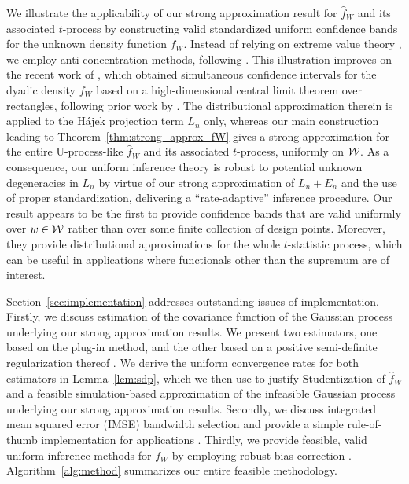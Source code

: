 We illustrate the applicability of our strong approximation result for
$\hat{f}_W$ and its associated $t$-process by constructing valid
standardized uniform confidence bands for
the unknown density function $f_W$.
Instead of relying on extreme value theory \citep*[e.g.][]{gine2004kernel}, we
employ anti-concentration methods, following \citet{chernozhukov2014anti}.
This illustration improves on the recent work of \citet{chiang2022inference},
which obtained simultaneous confidence intervals for the dyadic density $f_W$
based on a high-dimensional central limit theorem over rectangles,
following prior work by \citet{Chernozhukov-Chetverikov-Kato_2017_AoP}.
The distributional
approximation therein is applied to the
H\'{a}jek projection term $L_n$ only, whereas
our main construction leading to Theorem~\ref{thm:strong_approx_fW} gives a
strong approximation for the entire U-process-like
$\hat{f}_W$ and its associated $t$-process, uniformly on $\mathcal{W}$.
As a consequence, our uniform inference theory is robust to potential
unknown degeneracies in $L_n$ by virtue of our strong
approximation of $L_n+E_n$ and the use of proper standardization,
delivering a ``rate-adaptive'' inference procedure.
Our result appears to be the first to provide
confidence bands that are valid uniformly
over $w \in \mathcal{W}$ rather than over some finite collection of design points.
Moreover, they provide distributional approximations for
the whole $t$-statistic process,
which can be useful in applications where functionals other
than the supremum are of interest.

Section~\ref{sec:implementation} addresses outstanding issues of
implementation. Firstly, we discuss estimation of the covariance function of the
Gaussian process underlying our strong approximation results. We present two
estimators, one based on the plug-in method, and the other based on a
positive semi-definite regularization thereof
\citep{laurent2005semidefinite}. We derive the uniform convergence rates for
both estimators in Lemma~\ref{lem:sdp}, which we then use to justify
Studentization of $\hat{f}_W$ and a
feasible simulation-based approximation of the infeasible Gaussian process
underlying our strong approximation results.
Secondly, we discuss integrated mean
squared error (IMSE) bandwidth selection and provide a simple rule-of-thumb
implementation for applications \citep{wand1994kernel,simonoff2012smoothing}.
Thirdly, we provide
feasible, valid uniform inference methods for
$f_W$ by employing robust bias correction
\citep{Calonico-Cattaneo-Farrell_2018_JASA,
Calonico-Cattaneo-Farrell_2022_Bernoulli}.
Algorithm~\ref{alg:method} summarizes our entire feasible methodology.

